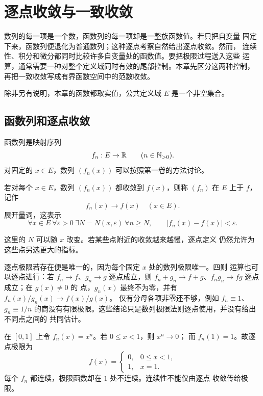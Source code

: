 \chapter{逐点收敛与一致收敛}
\label{chap:pointwise-uniform-convergence}

数列的每一项是一个数，函数列的每一项却是一整族函数值。若只把自变量
固定下来，函数列便退化为普通数列；这种逐点考察自然给出逐点收敛。然而，
连续性、积分和微分都同时比较许多自变量处的函数值。要把极限过程送入这些
运算，通常需要一种对整个定义域同时有效的尾部控制。本章先区分这两种控制，
再把一致收敛写成有界函数空间中的范数收敛。

除非另有说明，本章的函数都取实值，公共定义域 \(E\) 是一个非空集合。

\section{函数列和逐点收敛}

函数列是映射序列
\[
 f_n:E\to\mathbb{R}\qquad(n\in\mathbb{N}_{>0}).
\]
对固定的 \(x\in E\)，数列 \((f_n(x))\) 可以按照第一卷的方法讨论。

\begin{definition}[逐点收敛]
若对每个 \(x\in E\)，数列 \((f_n(x))\) 都收敛到 \(f(x)\)，则称
\((f_n)\) 在 \(E\) 上于 \(f\)，记作
\[
 f_n(x)\longrightarrow f(x)\quad(x\in E).
\]
展开量词，这表示
\[
 \forall x\in E\ \forall\varepsilon>0\ \exists N=N(x,\varepsilon)
 \ \forall n\ge N,
 \qquad |f_n(x)-f(x)|<\varepsilon.
\]
\end{definition}

这里的 \(N\) 可以随 \(x\) 改变。若某些点附近的收敛越来越慢，逐点定义
仍然允许为这些点另选更大的指标。

逐点极限若存在便是唯一的，因为每个固定 \(x\) 处的数列极限唯一。四则
运算也可以逐点进行：若 \(f_n\to f\)、\(g_n\to g\) 逐点成立，则
\(f_n+g_n\to f+g\)、\(f_ng_n\to fg\) 逐点成立；在 \(g(x)\ne0\) 的
点，\(g_n(x)\) 最终不为零，并有 \(f_n(x)/g_n(x)\to f(x)/g(x)\)。
仅有分母各项非零还不够，例如 \(f_n\equiv1\)、\(g_n\equiv1/n\)
的商没有有限极限。这些结论只是数列极限法则逐点使用，并没有给出不同点之间的
共同估计。

\begin{example}
在 \([0,1]\) 上令 \(f_n(x)=x^n\)。若 \(0\le x<1\)，则 \(x^n\to0\)；
而 \(f_n(1)=1\)。故逐点极限为
\[
 f(x)=
 \begin{cases}
 0,&0\le x<1,\\
 1,&x=1.
 \end{cases}
\]
每个 \(f_n\) 都连续，极限函数却在 \(1\) 处不连续。连续性不能仅由逐点
收敛传给极限。
\end{example}

